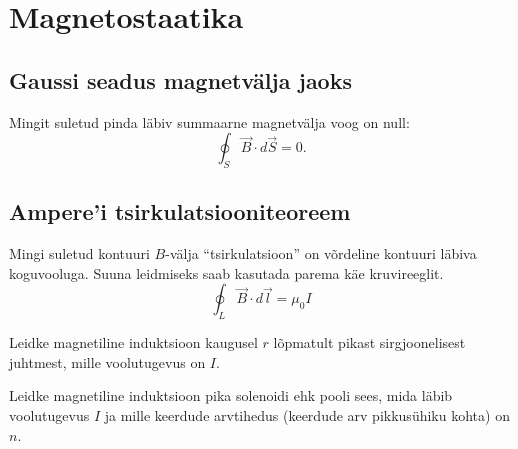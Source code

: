 \documentclass[a4paper,11pt,twocolumn]{article}
\begin{document}

\section{Magnetostaatika}
\subsection{Gaussi seadus magnetvälja jaoks}
Mingit suletud pinda läbiv summaarne magnetvälja voog on null:
\begin{equation*}
    \oint_S\vec{B}\cdot d\vec{S}=0 \tag{II Maxwelli võrrand}.
\end{equation*}

\subsection{Ampere'i tsirkulatsiooniteoreem}

Mingi suletud kontuuri $B$-välja \enquote{tsirkulatsioon} on võrdeline kontuuri läbiva koguvooluga. Suuna leidmiseks saab kasutada parema käe kruvireeglit.
\begin{equation*}
    \oint_L\vec{B}\cdot d\vec{l}=\mu_0 I \tag{III Maxwelli võrrand}
\end{equation*}
\begin{question}
    Leidke magnetiline induktsioon kaugusel $r$ lõpmatult pikast sirgjoonelisest juhtmest, mille voolutugevus on $I$.
\end{question}

\begin{question}
    Leidke magnetiline induktsioon pika solenoidi ehk pooli sees, mida läbib voolutugevus $I$ ja mille keerdude arvtihedus (keerdude arv pikkusühiku kohta) on $n$.
\end{question}
\end{document}
